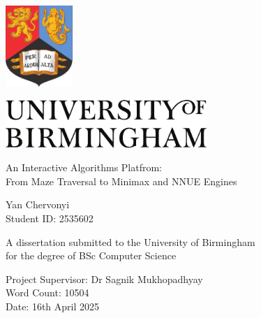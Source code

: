 \documentclass[12pt,a4paper]{article}
\begin{document}
\onehalfspacing        %

\author{Your Name \\ \small{Student ID: 123456}}
\date{\today}

\begin{titlepage}
  \begin{center}
      \includegraphics[width=1in]{figures/bham_crest}\par\vspace{0.3in}
      \includegraphics[width=3in]{figures/bham_logo}\par
      
      \vspace{2in}
      
      {\LARGE An Interactive Algorithms Platfrom:}\\
      {\LARGE From Maze Traversal to Minimax and NNUE Engines}\par
      
      \vspace{0.25in}
      
      {\Large Yan Chervonyi}\\
      \small Student ID: 2535602\par
      
      \vspace{1in}
      
      {\large A dissertation submitted to the University of Birmingham}\\
      {\large for the degree of BSc Computer Science}\par
  
  \end{center}
  
  \vfill
  
  \begin{flushright}
      Project Supervisor: Dr Sagnik Mukhopadhyay \\
      Word Count: 10504 \\
      Date: 16th April 2025
  \end{flushright}
  
  \end{titlepage}
  
\end{document}
